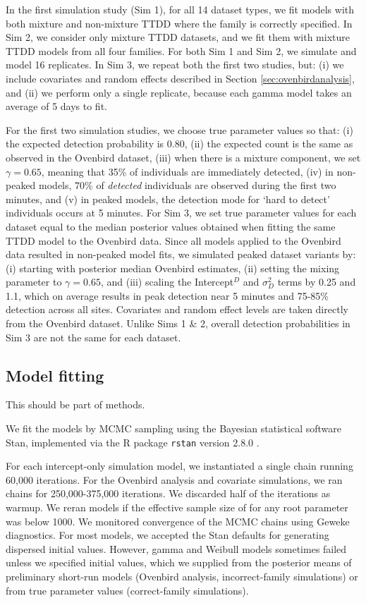\documentclass[useAMS,usenatbib,referee,12pt]{article}
\newcommand{\jarad}[1]{{\color{red} #1}}
\begin{document}
In the first simulation study (Sim 1), for all 14 dataset types, we fit models with both mixture and non-mixture TTDD where the family is correctly specified.  In Sim 2, we consider only mixture TTDD datasets, and we fit them with mixture TTDD models from all four families.  For both Sim 1 and Sim 2, we simulate and model 16 replicates.  In Sim 3, we repeat both the first two studies, but: (i) we include covariates and random effects described in Section \ref{sec:ovenbirdanalysis}, and (ii) we perform only a single replicate, because each gamma model takes an average of 5 days to fit.

For the first two simulation studies, we choose true parameter values so that: (i) the expected detection probability is 0.80, (ii) the expected count is the same as observed in the Ovenbird dataset, (iii) when there is a mixture component, we set $\gamma = 0.65$, meaning that 35\% of individuals are immediately detected, (iv) in non-peaked models, 70\% of \textit{detected} individuals are observed during the first two minutes, and (v) in peaked models, the detection mode for `hard to detect' individuals occurs at 5 minutes.  For Sim 3, we set true parameter values for each dataset equal to the median posterior values obtained when fitting the same TTDD model to the Ovenbird data.  Since all models applied to the Ovenbird data resulted in non-peaked model fits, we simulated peaked dataset variants by: (i) starting with posterior median Ovenbird estimates, (ii) setting the mixing parameter to $\gamma = 0.65$, and (iii) scaling the Intercept$^D$ and $\sigma_D^2$ terms by 0.25 and 1.1, which on average results in peak detection near 5 minutes and 75-85\% detection across all sites.  Covariates and random effect levels are taken directly from the Ovenbird dataset.  Unlike Sims 1 \& 2, overall detection probabilities in Sim 3 are not the same for each dataset.




\subsection{Model fitting}

\jarad{This should be part of methods.}

We fit the models by MCMC sampling using the Bayesian statistical software Stan, implemented via the R package \texttt{rstan} version 2.8.0 \citep{Rstan2015}.  

For each intercept-only simulation model, we instantiated a single chain running 60,000 iterations.  For the Ovenbird analysis and covariate simulations, we ran chains for 250,000-375,000 iterations.  We discarded half of the iterations as warmup.  We reran models if the effective sample size of for any root parameter was below 1000.  We monitored convergence of the MCMC chains using Geweke diagnostics.  For most models, we accepted the Stan defaults for generating dispersed initial values.  However, gamma and Weibull models sometimes failed unless we specified initial values, which we supplied from the posterior means of preliminary short-run models (Ovenbird analysis, incorrect-family simulations) or from true parameter values (correct-family simulations).
\end{document}
